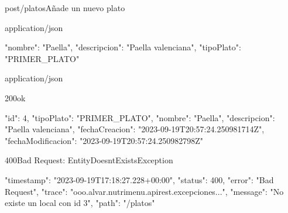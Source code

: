 \begin{apiRoute}{post}{/platos}{Añade un nuevo plato}
	\begin{routeParameter}
	\end{routeParameter}
	\begin{routeRequest}{application/json}
		\begin{routeRequestBody}
{
    "nombre": "Paella",
    "descripcion": "Paella valenciana",
    "tipoPlato": "PRIMER_PLATO"
}
		\end{routeRequestBody}
	\end{routeRequest}
	\begin{routeResponse}{application/json}
		\begin{routeResponseItem}{200}{ok}
			\begin{routeResponseItemBody}
{
    "id": 4,
    "tipoPlato": "PRIMER_PLATO",
    "nombre": "Paella",
    "descripcion": "Paella valenciana",
    "fechaCreacion": "2023-09-19T20:57:24.250981714Z",
    "fechaModificacion": "2023-09-19T20:57:24.250982798Z"
}
			\end{routeResponseItemBody}
		\end{routeResponseItem}
		\begin{routeResponseItem}{400}{Bad Request: EntityDoesntExistsException}
			\begin{routeResponseItemBody}
{
    "timestamp": "2023-09-19T17:18:27.228+00:00",
    "status": 400,
    "error": "Bad Request",
    "trace": "ooo.alvar.nutrimenu.apirest.excepciones...",
    "message": "No existe un local con id 3",
    "path": "/platos"
}
			\end{routeResponseItemBody}
		\end{routeResponseItem}
	\end{routeResponse}
\end{apiRoute}

